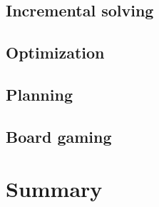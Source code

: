 \subsection{Incremental solving}

\subsection{Optimization}

\subsection{Planning}

\subsection{Board gaming}

\section{Summary}

%
